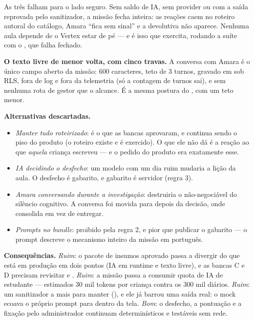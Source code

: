 As três falham para o lado seguro. Sem saldo de IA, sem provider ou com a saída
reprovada pelo sanitizador, a missão fecha inteira: as reações caem no roteiro
autoral do catálogo, Amara \enquote{fica sem sinal} e a devolutiva não aparece.
Nenhuma aula depende de o Vertex estar de pé --- e é isso que
 exercita, rodando a suíte com o
, que falha fechado.

\textbf{O texto livre de menor volta, com cinco travas.} A conversa com Amara é
o único campo aberto da missão: 600 caracteres, teto de 3 turnos, gravado em
 sob RLS, fora de log e fora da telemetria (só a
contagem de turnos sai), e sem nenhuma rota de gestor que o alcance. É a mesma
postura do , com um teto menor.

\textbf{Alternativas descartadas.}
\begin{itemize}
  \item \emph{Manter tudo roteirizado}: é o que as bancas aprovaram, e continua
    sendo o piso do produto (o roteiro existe e é exercido). O que ele não dá é
    a reação ao que \emph{aquela} criança escreveu --- e o pedido do produto era
    exatamente esse.
  \item \emph{IA decidindo o desfecho}: um modelo com um dia ruim mudaria a
    lição da aula. O desfecho é gabarito, e gabarito é servidor (regra 3).
  \item \emph{Amara conversando durante a investigação}: destruiria o
    não-negociável do silêncio cognitivo. A conversa foi movida para depois da
    decisão, onde consolida em vez de entregar.
  \item \emph{Prompts no bundle}: proibido pela regra 2, e pior que publicar o
    gabarito --- o prompt descreve o mecanismo inteiro da missão em português.
\end{itemize}

\textbf{Consequências.} \emph{Ruim}: o pacote de insumos aprovado passa a
divergir do que está em produção em dois pontos (IA em runtime e texto livre),
e as bancas C e D precisam revisitar  e . \emph{Ruim}: a
missão passa a consumir quota de IA de estudante --- estimados 30 mil tokens
por criança contra os 300 mil diários. \emph{Ruim}: um sanitizador a mais para
manter (), e ele já barrou uma saída real: o mock
ecoava o próprio prompt para dentro da tela. \emph{Bom}: o desfecho, a
pontuação e a fixação pelo administrador continuam determinísticos e testáveis
sem rede.

